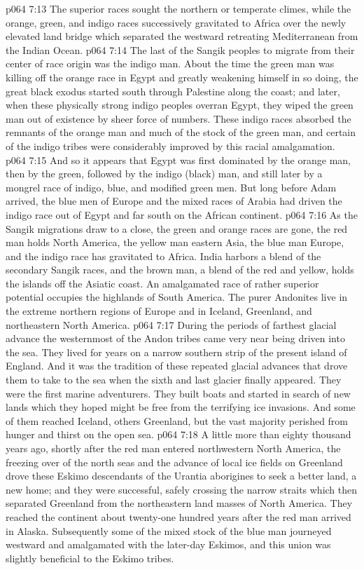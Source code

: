 \pc \vs p064 7:13 The superior races sought the northern or temperate climes, while the orange, green, and indigo races successively gravitated to Africa over the newly elevated land bridge which separated the westward retreating Mediterranean from the Indian Ocean.
\vs p064 7:14 The last of the Sangik peoples to migrate from their center of race origin was the indigo man. About the time the green man was killing off the orange race in Egypt and greatly weakening himself in so doing, the great black exodus started south through Palestine along the coast; and later, when these physically strong indigo peoples overran Egypt, they wiped the green man out of existence by sheer force of numbers. These indigo races absorbed the remnants of the orange man and much of the stock of the green man, and certain of the indigo tribes were considerably improved by this racial amalgamation.
\vs p064 7:15 And so it appears that Egypt was first dominated by the orange man, then by the green, followed by the indigo (black) man, and still later by a mongrel race of indigo, blue, and modified green men. But long before Adam arrived, the blue men of Europe and the mixed races of Arabia had driven the indigo race out of Egypt and far south on the African continent.
\vs p064 7:16 As the Sangik migrations draw to a close, the green and orange races are gone, the red man holds North America, the yellow man eastern Asia, the blue man Europe, and the indigo race has gravitated to Africa. India harbors a blend of the secondary Sangik races, and the brown man, a blend of the red and yellow, holds the islands off the Asiatic coast. An amalgamated race of rather superior potential occupies the highlands of South America. The purer Andonites live in the extreme northern regions of Europe and in Iceland, Greenland, and northeastern North America.
\pc \vs p064 7:17 During the periods of farthest glacial advance the westernmost of the Andon tribes came very near being driven into the sea. They lived for years on a narrow southern strip of the present island of England. And it was the tradition of these repeated glacial advances that drove them to take to the sea when the sixth and last glacier finally appeared. They were the first marine adventurers. They built boats and started in search of new lands which they hoped might be free from the terrifying ice invasions. And some of them reached Iceland, others Greenland, but the vast majority perished from hunger and thirst on the open sea.
\vs p064 7:18 A little more than eighty thousand years ago, shortly after the red man entered northwestern North America, the freezing over of the north seas and the advance of local ice fields on Greenland drove these Eskimo descendants of the Urantia aborigines to seek a better land, a new home; and they were successful, safely crossing the narrow straits which then separated Greenland from the northeastern land masses of North America. They reached the continent about twenty\hyp{}one hundred years after the red man arrived in Alaska. Subsequently some of the mixed stock of the blue man journeyed westward and amalgamated with the later\hyp{}day Eskimos, and this union was slightly beneficial to the Eskimo tribes.
